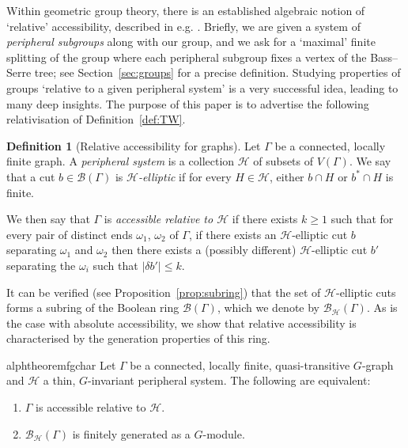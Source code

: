 \documentclass[11pt,a4paper]{amsart}
\theoremstyle{definition}
\newtheorem{definition}[theorem]{Definition}
\newcommand{\per}{\mathcal{H}}
\newcommand{\br}{{\mathscr{B}}}
\begin{document}
Within geometric group theory, there is an established algebraic notion of `relative' accessibility, described in e.g. \cite{jsj}. Briefly, we are given a system of \emph{peripheral subgroups} along with our group, and we ask for a `maximal' finite splitting of the group where each peripheral subgroup fixes a vertex of the Bass--Serre tree; see Section~\ref{sec:groups} for a precise definition.
Studying properties of groups `relative to a given peripheral system' is a very successful idea, leading to many deep insights. The purpose of this paper is to advertise the following relativisation of Definition~\ref{def:TW}. 

\begin{definition}[Relative accessibility for graphs]\label{def:rel-acc-intro}
    Let $\Gamma$ be a connected, locally finite graph. A \emph{peripheral system} is a collection $\per$ of subsets of $V(\Gamma)$.
    We say that a cut $b \in \br(\Gamma)$ is \emph{$\per$-elliptic} if for every $H \in \per$,  either $b \cap H$ or $b^\ast \cap H$ is finite. 
    
    We then say that $\Gamma$ is \emph{accessible relative to $\per$} if there exists $k \geq 1$ such that for every pair of distinct ends $\omega_1$, $\omega_2$ of $\Gamma$, if there exists an $\per$-elliptic cut $b$ separating $\omega_1$ and $\omega_2$ then there exists a (possibly different) $\per$-elliptic cut $b'$ separating the $\omega_i$ such that $|\delta b'| \leq k$.
\end{definition}


 It can be verified (see Proposition~\ref{prop:subring}) that the set of $\per$-elliptic cuts forms a subring of the Boolean ring $\br(\Gamma)$, which we denote by $\br_\per(\Gamma)$. As is the case with absolute accessibility, we show that relative accessibility is characterised by the generation properties of this ring.


\begin{restatable}{alphtheorem}{fgchar}\label{thm:fg-char}
    Let $\Gamma$ be a connected, locally finite, quasi-transitive $G$-graph and $\per$ a thin, $G$-invariant peripheral system. The following are equivalent:
    \begin{enumerate}
        \item $\Gamma$ is accessible relative to $\per$.

        \item $\br_\per(\Gamma)$ is finitely generated as a $G$-module.
    \end{enumerate}
\end{restatable}
\end{document}
